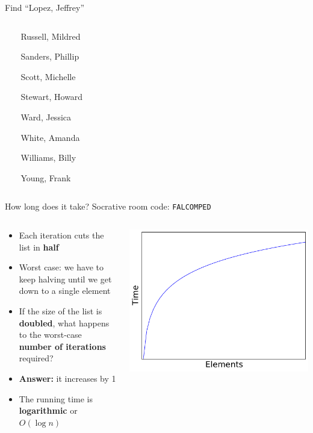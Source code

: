 \begin{frame}{Find ``Lopez, Jeffrey''}
\begin{columns}
\begin{column}{0.3\textwidth}
{{{				$\phantom\longrightarrow$ Russell, Mildred \par
				$\phantom\longrightarrow$ Sanders, Phillip \par
				$\phantom\longrightarrow$ Scott, Michelle \par
				$\phantom\longrightarrow$ Stewart, Howard \par
				$\phantom\longrightarrow$ Ward, Jessica \par
				$\phantom\longrightarrow$ White, Amanda \par
				$\phantom\longrightarrow$ Williams, Billy \par
				$\phantom\longrightarrow$ Young, Frank
				}
			}}
		\end{column}
	\end{columns}
\end{frame}

\begin{frame}{How long does it take?}
	Socrative room code: \texttt{FALCOMPED}
	\begin{columns}
		\begin{column}{0.55\textwidth}
			\begin{itemize}
				\item Each iteration cuts the list in \textbf{half} \pause
				\item Worst case: we have to keep halving until we get down to a single element \pause
				\item If the size of the list is \textbf{doubled}, what happens to the worst-case
					\textbf{number of iterations} required? \pause
				\item \textbf{Answer:} it increases by 1 \pause
				\item The running time is \textbf{logarithmic} or $O(\log n)$ \pause
			\end{itemize}
		\end{column}
		\begin{column}{0.45\textwidth}
			\includegraphics[width=\textwidth]{plot2_log}
		\end{column}
	\end{columns}
\end{frame}

